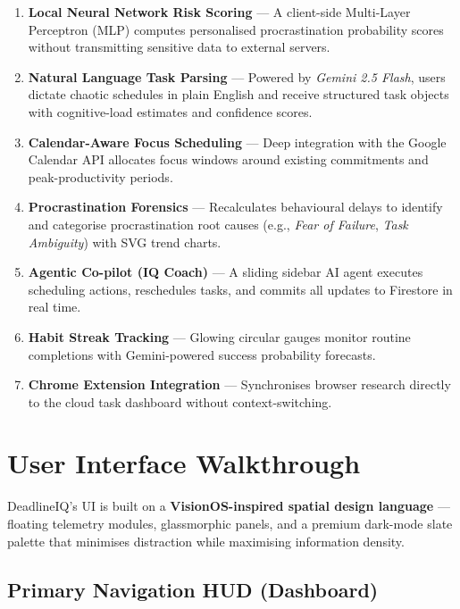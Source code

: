 \documentclass[12pt,a4paper]{report}
\begin{document}
\begin{enumerate}[leftmargin=*, label=\textbf{\arabic*.}, itemsep=6pt]
  \item \textbf{Local Neural Network Risk Scoring} — A client-side Multi-Layer Perceptron (MLP) computes personalised procrastination probability scores without transmitting sensitive data to external servers.
  \item \textbf{Natural Language Task Parsing} — Powered by \textit{Gemini 2.5 Flash}, users dictate chaotic schedules in plain English and receive structured task objects with cognitive-load estimates and confidence scores.
  \item \textbf{Calendar-Aware Focus Scheduling} — Deep integration with the Google Calendar API allocates focus windows around existing commitments and peak-productivity periods.
  \item \textbf{Procrastination Forensics} — Recalculates behavioural delays to identify and categorise procrastination root causes (e.g., \textit{Fear of Failure}, \textit{Task Ambiguity}) with SVG trend charts.
  \item \textbf{Agentic Co-pilot (IQ Coach)} — A sliding sidebar AI agent executes scheduling actions, reschedules tasks, and commits all updates to Firestore in real time.
  \item \textbf{Habit Streak Tracking} — Glowing circular gauges monitor routine completions with Gemini-powered success probability forecasts.
  \item \textbf{Chrome Extension Integration} — Synchronises browser research directly to the cloud task dashboard without context-switching.
\end{enumerate}

\chapter{User Interface Walkthrough}
\label{ch:ui}

DeadlineIQ's UI is built on a \textbf{VisionOS-inspired spatial design language} — floating telemetry modules, glassmorphic panels, and a premium dark-mode slate palette that minimises distraction while maximising information density.

\section{Primary Navigation HUD (Dashboard)}
\end{document}
